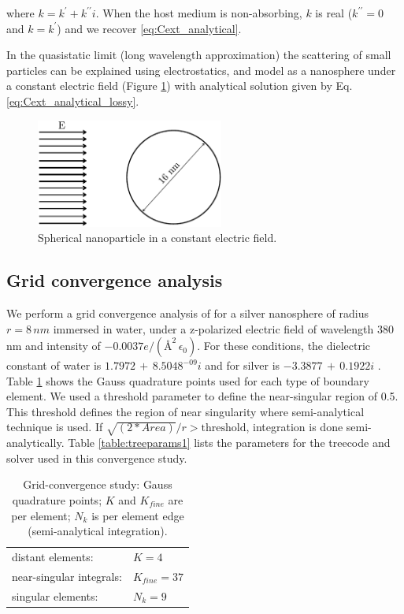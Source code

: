 where $k=k^\prime + k^{\prime\prime}i$. When the host medium is 
non-absorbing, $k$ is real ($k^{\prime\prime} = 0$ and $k=k^\prime$) and we 
recover \eqref{eq:Cext_analytical}. 

In the quasistatic limit (long wavelength approximation) the scattering 
of small particles can be explained using electrostatics, and model as
a nanosphere under a constant electric field (Figure \ref{fig:sph_field}) 
with analytical solution given by Eq. \eqref{eq:Cext_analytical_lossy}.

\begin{figure}%
    \centering
    \includegraphics[width=0.55\textwidth]{sphere_field_8nm.pdf} 
    \caption{Spherical nanoparticle in a constant electric field.}
    \label{fig:sph_field}
\end{figure}

\subsection{Grid convergence analysis}\label{sub_sec:grid_conv_iso}

We perform a grid convergence analysis of \pygbe for a silver nanosphere 
of radius $r=8\,nm$ immersed in water, under a z-polarized electric field
of wavelength 380 nm and intensity of $-0.0037 e/(\text{\AA}^2 \, \epsilon_0)$.
For these conditions, the dielectric constant of water is
$1.7972 \, + \, 8.5048^{-09}i$ \cite{HaleQuerry1972} and for silver is
$-3.3877 \, + \, 0.1922i$ \cite{JohnsonChristy1972}. 
Table  \ref{table:quadparams1} shows the Gauss quadrature points used for each 
type of boundary element. We used a threshold parameter to define the near-singular
region of 0.5. This threshold defines the region of near singularity where 
semi-analytical technique is used. If $\sqrt{(2*Area)}/r > \text{threshold}$,
integration is done semi-analytically.
Table \ref{table:treeparams1} lists the parameters for the treecode and solver 
used in this convergence study.

\begin{table}%
    \centering
    \caption{\label{table:quadparams1} Grid-convergence study: Gauss quadrature points; 
    $K$ and $K_{fine}$ are per element; $N_k $ is per element edge (semi-analytical integration). } 
    \begin{tabular}{l l}
    \hline%
     distant elements: & $K=4$ \\
     near-singular integrals:   & $ K_{fine}=37$ \\
     singular elements:  & $N_k =9$ \\
    \hline%
    \end{tabular}
\end{table}


